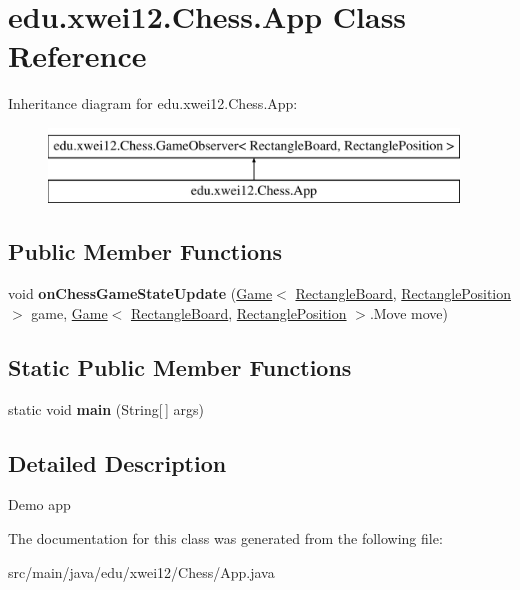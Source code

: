 \hypertarget{classedu_1_1xwei12_1_1_chess_1_1_app}{}\section{edu.\+xwei12.\+Chess.\+App Class Reference}
\label{classedu_1_1xwei12_1_1_chess_1_1_app}
Inheritance diagram for edu.\+xwei12.\+Chess.\+App\+:\begin{figure}[H]
\begin{center}
\leavevmode
\includegraphics[height=2.000000cm]{classedu_1_1xwei12_1_1_chess_1_1_app}
\end{center}
\end{figure}
\subsection*{Public Member Functions}
\begin{DoxyCompactItemize}
\item 
void {\bfseries on\+Chess\+Game\+State\+Update} (\hyperlink{classedu_1_1xwei12_1_1_chess_1_1_game}{Game}$<$ \hyperlink{classedu_1_1xwei12_1_1_chess_1_1_rectangle_board}{Rectangle\+Board}, \hyperlink{classedu_1_1xwei12_1_1_chess_1_1_rectangle_position}{Rectangle\+Position} $>$ game, \hyperlink{classedu_1_1xwei12_1_1_chess_1_1_game}{Game}$<$ \hyperlink{classedu_1_1xwei12_1_1_chess_1_1_rectangle_board}{Rectangle\+Board}, \hyperlink{classedu_1_1xwei12_1_1_chess_1_1_rectangle_position}{Rectangle\+Position} $>$.Move move)\hypertarget{classedu_1_1xwei12_1_1_chess_1_1_app_a89a440a5330f507912a445f08ea80b8a}{}\label{classedu_1_1xwei12_1_1_chess_1_1_app_a89a440a5330f507912a445f08ea80b8a}

\end{DoxyCompactItemize}
\subsection*{Static Public Member Functions}
\begin{DoxyCompactItemize}
\item 
static void {\bfseries main} (String\mbox{[}$\,$\mbox{]} args)\hypertarget{classedu_1_1xwei12_1_1_chess_1_1_app_acdd5cf614f6f2776d7de0f642ade6950}{}\label{classedu_1_1xwei12_1_1_chess_1_1_app_acdd5cf614f6f2776d7de0f642ade6950}

\end{DoxyCompactItemize}


\subsection{Detailed Description}
Demo app 

The documentation for this class was generated from the following file\+:\begin{DoxyCompactItemize}
\item 
src/main/java/edu/xwei12/\+Chess/App.\+java\end{DoxyCompactItemize}
